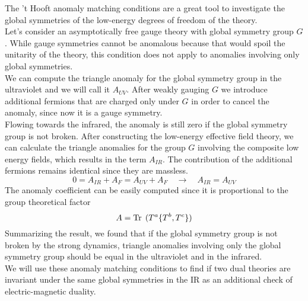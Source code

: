 The 't Hooft anomaly matching conditions are a great tool to investigate the global symmetries of the low-energy degrees of freedom of the theory.\\ 
Let's consider an asymptotically free gauge theory with global symmetry group $G$. 
While gauge symmetries cannot be anomalous because that would spoil the unitarity of the theory, this condition does not apply to anomalies involving only global symmetries.\\
We can compute the triangle anomaly for the global symmetry group in the ultraviolet and we will call it $A_{UV}$. 
After weakly gauging $G$ we introduce additional fermions that are charged only under $G$ in order to cancel the anomaly, since now it is a gauge symmetry.\\
Flowing towards the infrared, the anomaly is still zero if the global symmetry group is not broken.
After constructing the low-energy effective field theory, 
we can calculate the triangle anomalies for the group $G$ involving the composite low energy fields, which results in the term $A_{IR}$.
The contribution of the additional fermions remains identical since they are massless.
\begin{equation}
 0 = A_{IR} + A_{F} = A_{UV} + A_{F} \quad \rightarrow \quad A_{IR} = A_{UV}
\end{equation}
The anomaly coefficient can be easily computed since it is proportional to the group theoretical factor
\begin{equation}
 A = \mathrm{Tr } \, \; ( T^a \{ T^b, T^c \})
\end{equation}
Summarizing the result, we found that if the global symmetry group is not broken by the strong dynamics, triangle anomalies involving only the global symmetry group should be equal in the ultraviolet and in the infrared.\\
We will use these anomaly matching conditions to find if two dual theories are invariant under the same global symmetries in the IR as an additional check of electric-magnetic duality.


